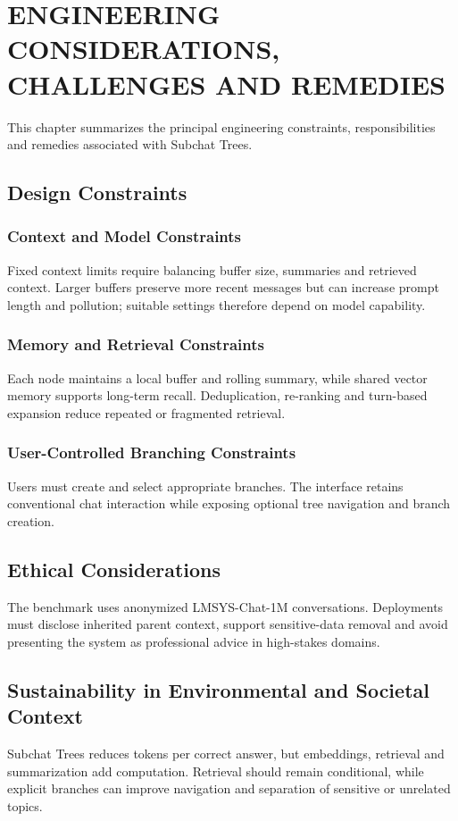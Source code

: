\chapter{ENGINEERING CONSIDERATIONS, CHALLENGES AND REMEDIES}\label{ch:engineering}
\vspace{-3em}

This chapter summarizes the principal engineering constraints, responsibilities and remedies associated with Subchat Trees.

\section{Design Constraints}

\subsection{Context and Model Constraints}
Fixed context limits require balancing buffer size, summaries and retrieved context. Larger buffers preserve more recent messages but can increase prompt length and pollution; suitable settings therefore depend on model capability.

\subsection{Memory and Retrieval Constraints}
Each node maintains a local buffer and rolling summary, while shared vector memory supports long-term recall. Deduplication, re-ranking and turn-based expansion reduce repeated or fragmented retrieval.

\subsection{User-Controlled Branching Constraints}
Users must create and select appropriate branches. The interface retains conventional chat interaction while exposing optional tree navigation and branch creation.

\section{Ethical Considerations}
The benchmark uses anonymized LMSYS-Chat-1M conversations. Deployments must disclose inherited parent context, support sensitive-data removal and avoid presenting the system as professional advice in high-stakes domains.

\section{Sustainability in Environmental and Societal Context}
Subchat Trees reduces tokens per correct answer, but embeddings, retrieval and summarization add computation. Retrieval should remain conditional, while explicit branches can improve navigation and separation of sensitive or unrelated topics.

